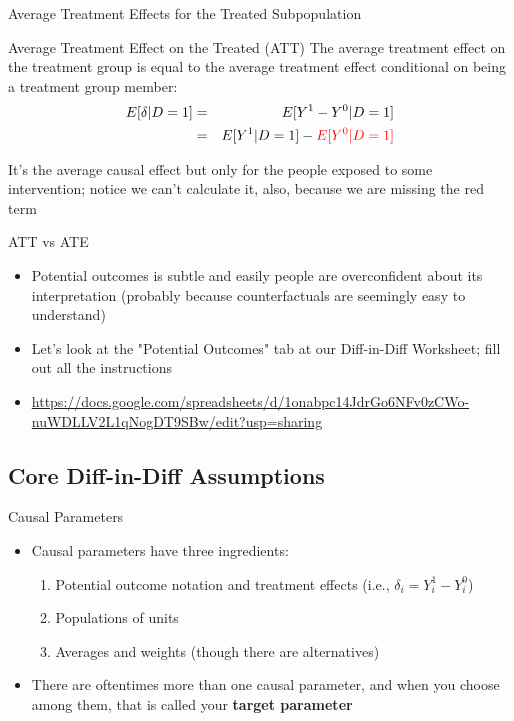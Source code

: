 \documentclass{beamer}
\begin{document}
\begin{frame}{Average Treatment Effects for the Treated Subpopulation}
	\begin{block}{Average Treatment Effect on the Treated (ATT)}
	The average treatment effect on the treatment group is equal to the average treatment effect conditional on being a treatment group member:
		\begin{eqnarray*}
		E[\delta|D=1]&=&E[Y^1-Y^0|D=1] \nonumber \\
		&=&E[Y^1|D=1]-\textcolor{red}{E[Y^0|D=1]}
		\end{eqnarray*}
	\end{block}

	\bigskip

It's the average causal effect but only for the people exposed to some intervention; notice we can't calculate it, also, because we are missing the red term


\end{frame}

\begin{frame}{ATT vs ATE}

\begin{itemize}
\item Potential outcomes is subtle and easily people are overconfident about its interpretation (probably because counterfactuals are seemingly easy to understand)
\item Let's look at the "Potential Outcomes" tab at our Diff-in-Diff Worksheet; fill out all the instructions 
\item \url{https://docs.google.com/spreadsheets/d/1onabpc14JdrGo6NFv0zCWo-nuWDLLV2L1qNogDT9SBw/edit?usp=sharing}
\end{itemize}

\end{frame}




\subsection{Core Diff-in-Diff Assumptions}

\begin{frame}{Causal Parameters}

\begin{itemize}
\item Causal parameters have three ingredients:
	\begin{enumerate}
	\item Potential outcome notation and treatment effects (i.e., $\delta_i = Y^1_i - Y^0_i$)
	\item Populations of units
	\item Averages and weights (though there are alternatives)
	\end{enumerate}
\item There are oftentimes more than one causal parameter, and when you choose among them, that is called your \textbf{target parameter}
\end{itemize}

\end{frame}
\end{document}
